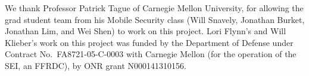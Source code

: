 \begin{acknowledgments}
We thank Professor Patrick Tague of Carnegie Mellon University, for allowing the grad student team from his Mobile Security class (Will Snavely, Jonathan Burket, Jonathan Lim, and Wei Shen) to work on this project. Lori Flynn's and Will Klieber's work on this project was funded by the Department of Defense under 
Contract No.\ FA8721-05-C-0003 with Carnegie Mellon (for the
operation of the SEI, an FFRDC),
by ONR grant N000141310156.
\end{acknowledgments}
